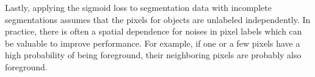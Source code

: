 Lastly, applying the sigmoid loss to segmentation data with incomplete segmentations assumes that the pixels for objects are unlabeled independently.
In practice, there is often a spatial dependence for noises in pixel labels which can be valuable to improve performance.
For example, if one or a few pixels have a high probability of being foreground, their neighboring pixels are probably also foreground.


%




